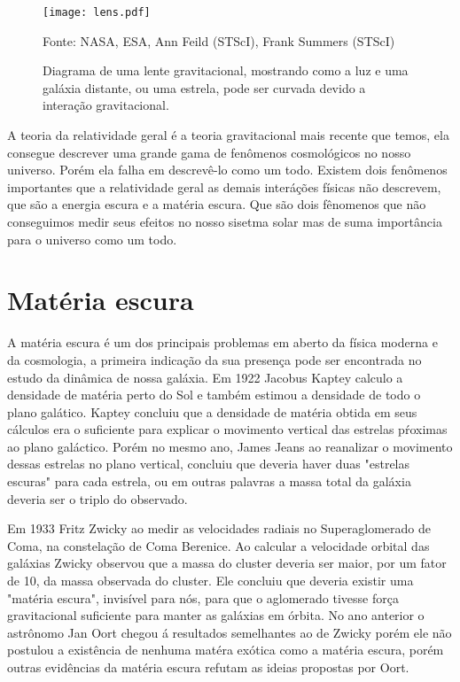 \documentclass[
	article,			%
	11pt,				%
	twoside,			%
	a4paper,			%
	english,			%
	brazil,				%
	sumario=tradicional
	]{abntex2}
\begin{document}
\begin{figure}\centering
	\caption{Diagrama de uma lente gravitacional, mostrando como a luz e uma galáxia distante, ou uma estrela, pode ser curvada devido a interação gravitacional.}
	\texttt{[image: lens.pdf]}
	\centering
	{\par \footnotesize Fonte: NASA, ESA, Ann Feild (STScI), Frank Summers (STScI)
		}
\end{figure}

A teoria da relatividade geral é a teoria gravitacional mais recente que temos, ela consegue descrever uma grande gama de fenômenos cosmológicos no nosso universo. Porém ela falha em descrevê-lo como um todo. Existem dois fenômenos importantes que a relatividade geral as demais interáções físicas não descrevem, que são a energia escura e a matéria escura. Que são dois fênomenos que não conseguimos medir seus efeitos no nosso sisetma solar mas de suma importância para o universo como um todo. 

\section{Matéria escura}

A matéria escura é um dos principais problemas em aberto da física moderna e da cosmologia, a primeira indicação da sua presença
pode ser encontrada no estudo da dinâmica de nossa galáxia. Em 1922 Jacobus Kaptey calculo a densidade
de matéria perto do Sol e também estimou a densidade de todo o plano galático\cite{1922ApJ55302K}. Kaptey concluiu que a densidade
de matéria obtida em seus cálculos era o suficiente para explicar o movimento vertical das estrelas pŕoximas ao plano galáctico. Porém no mesmo ano, James Jeans
ao reanalizar o movimento dessas estrelas no plano vertical, concluiu que deveria haver duas "estrelas escuras" para cada estrela\cite{10.1093/mnras/82.3.122}, ou em outras palavras a massa total
da galáxia deveria ser o triplo do observado.

Em 1933 Fritz Zwicky ao medir as velocidades radiais no Superaglomerado de Coma, na constelação de Coma Berenice. Ao calcular a velocidade orbital das galáxias
Zwicky observou que a massa do cluster deveria ser maior, por um fator de 10, da massa observada do cluster\cite{1933AcHPh...6..110Z}. Ele concluiu que deveria existir uma
"matéria escura", invisível para nós, para que o aglomerado tivesse força gravitacional suficiente para manter as galáxias em órbita. No ano anterior o astrônomo
Jan Oort chegou á resultados semelhantes ao de Zwicky porém ele não postulou a existência de nenhuma matéra exótica como a matéria escura, porém outras evidências
da matéria escura refutam as ideias propostas por Oort.
\end{document}
